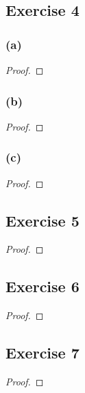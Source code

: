 \documentclass[14pt]{extarticle}
\begin{document}
\subsection{Exercise 4}

\subsubsection{(a)}

\begin{proof}

\end{proof}

\subsubsection{(b)}

\begin{proof}

\end{proof}

\subsubsection{(c)}

\begin{proof}

\end{proof}

\subsection{Exercise 5}

\begin{proof}

\end{proof}

\subsection{Exercise 6}

\begin{proof}

\end{proof}

\subsection{Exercise 7}

\begin{proof}

\end{proof}
\end{document}
